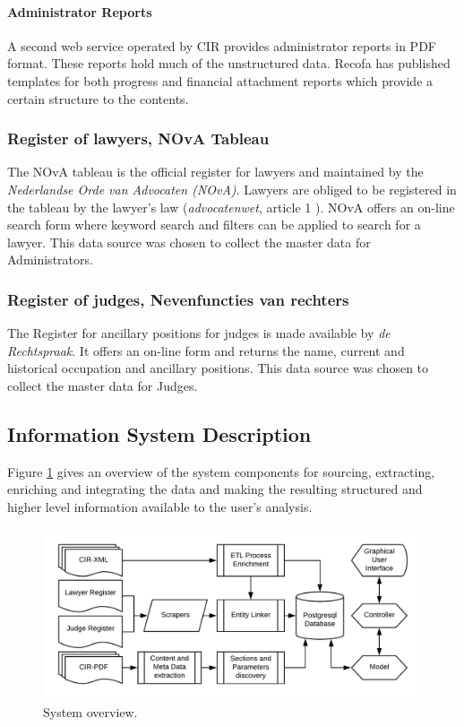 \paragraph{Administrator Reports}
A second web service operated by CIR provides administrator reports in PDF format. These reports hold much of the unstructured data. Recofa has published templates for both progress and financial attachment reports \cite{rechtspraak:3} which provide a certain structure to the contents.

\subsubsection{Register of lawyers, NOvA Tableau}\label{NOvA Tableau}
The NOvA tableau is the official register for lawyers and maintained by the \textit{Nederlandse Orde van Advocaten (NOvA)}\cite{nova:1}. Lawyers are obliged to be registered in the tableau by the lawyer's law (\textit{advocatenwet}, article 1 \cite{law:2}). NOvA offers an on-line search form where keyword search and filters can be applied to search for a lawyer. This data source was chosen to collect the master data for Administrators. 

\subsubsection{Register of judges, Nevenfuncties van rechters}\label{Nevenfuncties Rechters}
The Register for ancillary positions for judges is made available by \textit{de Rechtspraak}\cite{rechtspraak:2}. It offers an on-line form and returns the name, current and historical occupation and ancillary positions. This data source was chosen to collect the master data for Judges.

\subsection{Information System Description}
Figure \ref{System overview} gives an overview of the system components for sourcing, extracting, enriching and integrating the  data and making the resulting structured and higher level information available to the user's analysis.

\begin{figure}[h]
\includegraphics[width=1\linewidth]{images/system_overview.png}
\caption{System overview.}\label{System overview}
\end{figure}

